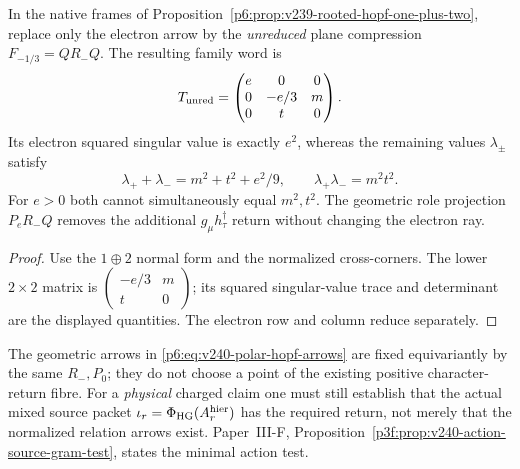 \documentclass[12pt,a4paper]{article}
\begin{document}
\begin{proposition}
\label{p6:prop:v240-unreduced-hopf-spectrum}
In the native frames of
Proposition~\ref{p6:prop:v239-rooted-hopf-one-plus-two}, replace only
the electron arrow by the \emph{unreduced} plane compression
$F_{-1/3}=QR_-Q$. The resulting family word is
\[
 T_{\rm unred}=\begin{pmatrix}
 e&0&0\\0&-e/3&m\\0&t&0
 \end{pmatrix}.
\]
Its electron squared singular value is exactly $e^2$, whereas the
remaining values $\lambda_\pm$ satisfy
\[
 \boxed{\lambda_++\lambda_-=m^2+t^2+e^2/9,\qquad
        \lambda_+\lambda_-=m^2t^2.}
\]
For $e>0$ both cannot simultaneously equal $m^2,t^2$.
The geometric role projection $P_eR_-Q$ removes the additional
$g_\mu h_\tau^\dagger$ return without changing the electron ray.
\end{proposition}
\begin{proof}
Use the $1\oplus2$ normal form and the normalized cross-corners.
The lower $2\times2$ matrix is
$\left(\begin{smallmatrix}-e/3&m\\t&0\end{smallmatrix}\right)$;
its squared singular-value trace and determinant are the displayed
quantities. The electron row and column reduce separately.
\end{proof}
\begin{remark}
\label{p6:rem:v240-hopf-physical-origin-firewall}
The geometric arrows in
\eqref{p6:eq:v240-polar-hopf-arrows} are fixed equivariantly by the
same $R_-,P_0$; they do not choose a point of the existing positive
character-return fibre. For a \emph{physical} charged claim one must
still establish that the actual mixed source packet
$\iota_r=\Phi_{\rm HG}(A_r^{\rm hier})$ has the required return,
not merely that the normalized relation arrows exist.
Paper~III-F, Proposition~\ref{p3f:prop:v240-action-source-gram-test},
states the minimal action test.
\end{remark}
\end{document}
